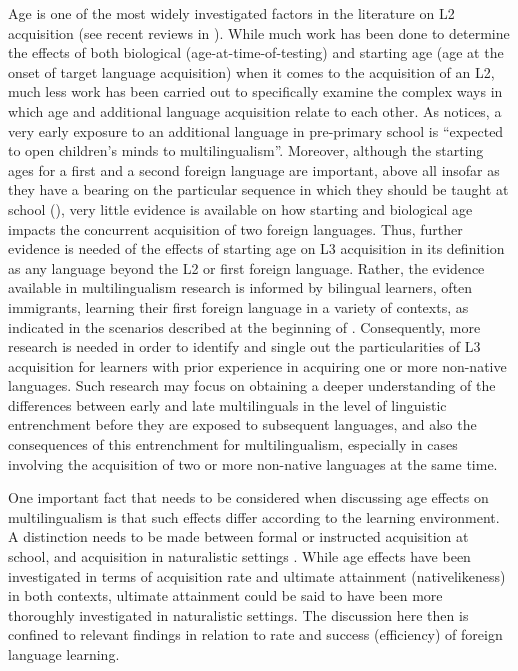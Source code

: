 \documentclass[output=paper,colorlinks,citecolor=brown,nonflat]{../langscibook}
\begin{document}
Age is one of the most widely investigated factors in the literature on L2 acquisition (see recent reviews in \citealt{PfenningerSingleton2017, SingletonPfenninger2018, Muñoz2019, MuñozSingleton2019}). While much work has been done to determine the effects of both biological (age-at-time-of-testing) and starting age (age at the onset of target language acquisition) when it comes to the acquisition of an L2, much less work has been carried out to specifically examine the complex ways in which age and additional language acquisition relate to each other. As \citet[433]{Muñoz2019} notices, a very early exposure to an additional language in pre-primary school is “expected to open children’s minds to multilingualism”. Moreover, although the starting ages for a first and a second foreign language are important, above all insofar as they have a bearing on the particular sequence in which they should be taught at school (\citealt[222]{MuñozSingleton2019}), very little evidence is available on how starting and biological age impacts the concurrent acquisition of two foreign languages. Thus, further evidence is needed of the effects of starting age on L3 acquisition in its definition as any language beyond the L2 or first foreign language. Rather, the evidence available in multilingualism research is informed by bilingual learners, often immigrants, learning their first foreign language in a variety of contexts, as indicated in the scenarios described at the beginning of . Consequently, more research is needed in order to identify and single out the particularities of L3 acquisition for learners with prior experience in acquiring one or more non-native languages. Such research may focus on obtaining a deeper understanding of the differences between early and late multilinguals in the level of linguistic entrenchment before they are exposed to subsequent languages, and also the consequences of this entrenchment for multilingualism, especially in cases involving the acquisition of two or more non-native languages at the same time.

One important fact that needs to be considered when discussing age effects on multilingualism is that such effects differ according to the learning environment. A distinction needs to be made between formal or instructed acquisition at school, and acquisition in naturalistic settings \citep{Bardel2019}. While age effects have been investigated in terms of acquisition rate and ultimate attainment (nativelikeness) in both contexts, ultimate attainment could be said to have been more thoroughly investigated in naturalistic settings. The discussion here then is confined to relevant findings in relation to rate and success (efficiency) of foreign language learning.
\end{document}
